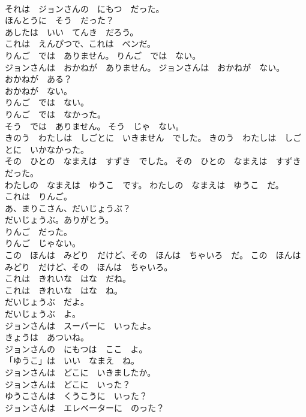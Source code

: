 \documentclass[8pt]{extreport}
\begin{document}
\begin{CJK}{UTF8}{min}
\\	それは　ジョンさんの　にもつ　だった。	
\\	ほんとうに　そう　だった？	
\\	あしたは　いい　てんき　だろう。	
\\	これは　えんぴつで、これは　ペンだ。	
\\	りんご　では　ありません。 りんご　では　ない。	
\\	ジョンさんは　おかねが　ありません。 ジョンさんは　おかねが　ない。	
\\	おかねが　ある？	
\\	おかねが　ない。	
\\	りんご　では　ない。	
\\	りんご　では　なかった。	
\\	そう　では　ありません。 そう　じゃ　ない。	
\\	きのう　わたしは　しごとに　いきません　でした。 きのう　わたしは　しごとに　いかなかった。	
\\	その　ひとの　なまえは　すずき　でした。 その　ひとの　なまえは　すずき　だった。	
\\	わたしの　なまえは　ゆうこ　です。 わたしの　なまえは　ゆうこ　だ。	
\\	これは　りんご。	
\\	あ、まりこさん、だいじょうぶ？	
\\	だいじょうぶ。ありがとう。	
\\	りんご　だった。	
\\	りんご　じゃない。	
\\	この　ほんは　みどり　だけど、その　ほんは　ちゃいろ　だ。 この　ほんは　みどり　だけど、その　ほんは　ちゃいろ。	
\\	これは　きれいな　はな　だね。	
\\	これは　きれいな　はな　ね。	
\\	だいじょうぶ　だよ。	
\\	だいじょうぶ　よ。	
\\	ジョンさんは　スーパーに　いったよ。	
\\	きょうは　あついね。	
\\	ジョンさんの　にもつは　ここ　よ。	
\\	「ゆうこ」は　いい　なまえ　ね。	
\\	ジョンさんは　どこに　いきましたか。	
\\	ジョンさんは　どこに　いった？	
\\	ゆうこさんは　くうこうに　いった？	
\\	ジョンさんは　エレベーターに　のった？	

\end{CJK}
\end{document}

